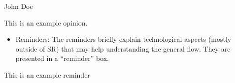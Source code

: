 \begin{SROpinion}{}{John Doe}{}

This is an example opinion.

\end{SROpinion} %

\begin{itemize}
\tightlist
\item
  Reminders: The reminders briefly explain technological aspects (mostly outside of SR) that may help understanding the general flow. They are presented in a ``reminder'' box.
\end{itemize}

\begin{SRReminder}{}{}

This is an example reminder

\end{SRReminder}

%
%
%
